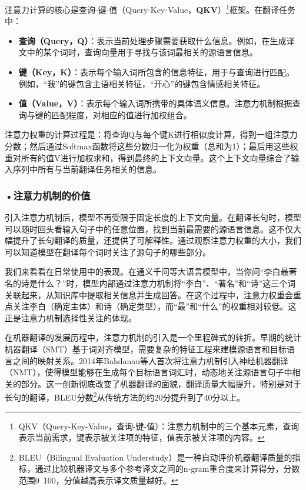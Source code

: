 注意力计算的核心是查询-键-值（Query-Key-Value，\textbf{QKV}）\footnote{QKV（Query-Key-Value，查询-键-值）：注意力机制中的三个基本元素，查询表示当前需求，键表示被关注项的特征，值表示被关注项的内容。}框架。在翻译任务中：
\begin{itemize}
\item \textbf{查询（Query，Q）}：表示当前处理步骤需要获取什么信息。例如，在生成译文中的某个词时，查询向量用于寻找与该词最相关的源语言信息。
\item \textbf{键（Key，K）}：表示每个输入词所包含的信息特征，用于与查询进行匹配。例如，“我”的键包含主语相关特征，“开心”的键包含情感相关特征。
\item \textbf{值（Value，V）}：表示每个输入词所携带的具体语义信息。注意力机制根据查询与键的匹配程度，对相应的值进行加权组合。
\end{itemize}

注意力权重的计算过程是：将查询Q与每个键K进行相似度计算，得到一组注意力分数；然后通过Softmax函数将这些分数归一化为权重（总和为1）；最后用这些权重对所有的值V进行加权求和，得到最终的上下文向量。这个上下文向量综合了输入序列中所有与当前翻译任务相关的信息。

\subsubsection*{\textbf{•注意力机制的价值}}

引入注意力机制后，模型不再受限于固定长度的上下文向量。在翻译长句时，模型可以随时回头看输入句子中的任意位置，找到当前最需要的源语言信息。这不仅大幅提升了长句翻译的质量，还提供了可解释性。通过观察注意力权重的大小，我们可以知道模型在翻译每个词时关注了源句子的哪些部分。

我们来看看在日常使用中的表现。在通义千问等大语言模型中，当你问“李白最著名的诗是什么？”时，模型内部通过注意力机制将“李白”、“著名”和“诗”这三个词关联起来，从知识库中提取相关信息并生成回答。在这个过程中，注意力权重会重点关注李白（确定主体）和诗（确定类型），而“最”和“什么”的权重相对较低。这正是注意力机制选择性关注的体现。

在机器翻译的发展历程中，注意力机制的引入是一个里程碑式的转折。早期的统计机器翻译（SMT）基于词对齐模型，需要复杂的特征工程来建模源语言和目标语言之间的映射关系。2014年Bahdanau等人首次将注意力机制引入神经机器翻译（NMT），使得模型能够在生成每个目标语言词汇时，动态地关注源语言句子中相关的部分。这一创新彻底改变了机器翻译的面貌，翻译质量大幅提升，特别是对于长句的翻译，BLEU分数\footnote{BLEU（Bilingual Evaluation Understudy）是一种自动评价机器翻译质量的指标，通过比较机器译文与多个参考译文之间的n-gram重合度来计算得分，分数范围0~100，分值越高表示译文质量越好。}从传统方法的约20分提升到了40分以上。

